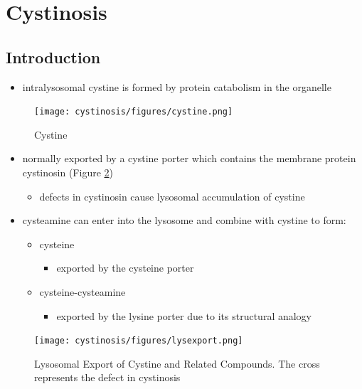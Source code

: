 \documentclass[12pt]{scrartcl}
\begin{document}
\section{Cystinosis}
\label{sec:org9febf04}
\subsection{Introduction}
\label{sec:org9401a75}
\begin{itemize}
\item intralysosomal cystine is formed by protein catabolism in the organelle
\end{itemize}

\begin{figure}[htbp]
\centering
\texttt{[image: cystinosis/figures/cystine.png]}
\caption{\label{fig:org1c4cc73}Cystine}
\end{figure}

\begin{itemize}
\item normally exported by a cystine porter which contains the membrane protein cystinosin (Figure \ref{fig:orgf53808b})
\begin{itemize}
\item defects in cystinosin cause lysosomal accumulation of cystine
\end{itemize}
\item cysteamine can enter into the lysosome and combine with cystine to form:
\begin{itemize}
\item cysteine
\begin{itemize}
\item exported by the cysteine porter
\end{itemize}
\item cysteine-cysteamine
\begin{itemize}
\item exported by the lysine porter due to its structural analogy
\end{itemize}
\end{itemize}
\end{itemize}

\begin{figure}[htbp]
\centering
\texttt{[image: cystinosis/figures/lysexport.png]}
\caption{\label{fig:orgf53808b}Lysosomal Export of Cystine and Related Compounds. The cross represents the defect in cystinosis}
\end{figure}
\end{document}
